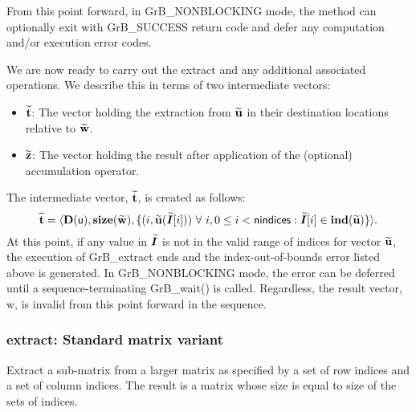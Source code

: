 From this point forward, in {\sf GrB\_NONBLOCKING} mode, the method can 
optionally exit with {\sf GrB\_SUCCESS} return code and defer any computation 
and/or execution error codes.

We are now ready to carry out the extract and any additional 
associated operations.  We describe this in terms of two intermediate vectors:
\begin{itemize}
    \item ${\bf \widetilde{t}}$: The vector holding the extraction from
    ${\bf \widetilde{u}}$ in their destination locations relative to
    ${\bf \widetilde{w}}$.

    \item ${\bf \widetilde{z}}$: The vector holding the result after 
    application of the (optional) accumulation operator.
\end{itemize}

The intermediate vector, ${\bf \widetilde{t}}$, is created as follows:
\[
{\bf \widetilde{t}} = \langle
\bold{D}({\sf u}), \bold{size}({\bf \widetilde{w}}),
\{(i,{\bf \widetilde{u}}(\bm{\widetilde{I}}[i])) \ \forall \ i, 0 \leq i < {\sf nindices} : 
\bm{\widetilde{I}}[i] \in \bold{ind}({\bf \widetilde{u}}) \} \rangle. 
\]
At this point, if any value in $\bm{\widetilde{I}}$ is not in 
the valid range of indices for vector ${\bf \widetilde{u}}$, the execution of
{\sf GrB\_extract} ends and the index-out-of-bounds error listed above is 
generated.  In {\sf GrB\_NONBLOCKING} mode, the error can be deferred until a 
sequence-terminating {\sf GrB\_wait()} is called.  Regardless, the result 
vector, {\sf w}, is invalid from this point forward in the 
sequence.







\subsubsection{{\sf extract}: Standard matrix variant}

Extract a sub-matrix from a larger matrix as specified by a set of row indices
and a set of column indices.  The result is a matrix whose size is equal to size of the sets of indices.

\paragraph{\syntax}

